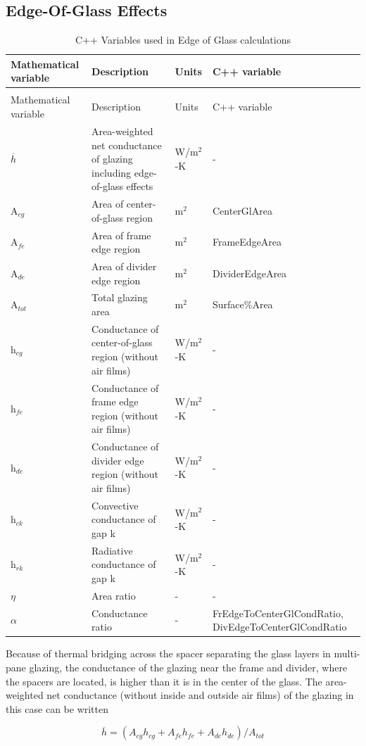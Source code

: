 \subsection{Edge-Of-Glass Effects}\label{edge-of-glass-effects}

\begin{longtable}[c]{p{1.0in}p{2.5in}p{1.0in}p{1.5in}}
\caption{C++ Variables used in Edge of Glass calculations \label{table:c++-variables-used-in-edge-of-glass}} \tabularnewline
\toprule 
Mathematical variable & Description & Units & C++ variable \tabularnewline
\midrule
\endfirsthead

\caption[]{C++ Variables used in Edge of Glass calculations} \tabularnewline
\toprule 
Mathematical variable & Description & Units & C++ variable \tabularnewline
\midrule
\endhead

\(\overline h\) & Area-weighted net conductance of glazing including edge-of-glass effects & W/m\(^{2}\)-K & - \tabularnewline
A\(_{cg}\) & Area of center-of-glass region & m\(^{2}\) & CenterGlArea \tabularnewline
A\(_{fe}\) & Area of frame edge region & m\(^{2}\) & FrameEdgeArea \tabularnewline
A\(_{de}\) & Area of divider edge region & m\(^{2}\) & DividerEdgeArea \tabularnewline
A\(_{tot}\) & Total glazing area & m\(^{2}\) & Surface\%Area \tabularnewline
h\(_{cg}\) & Conductance of center-of-glass region (without air films) & W/m\(^{2}\)-K & - \tabularnewline
h\(_{fe}\) & Conductance of frame edge region (without air films) & W/m\(^{2}\)-K & - \tabularnewline
h\(_{de}\) & Conductance of divider edge region (without air films) & W/m\(^{2}\)-K & - \tabularnewline
h\(_{ck}\) & Convective conductance of gap k & W/m\(^{2}\)-K & - \tabularnewline
h\(_{rk}\) & Radiative conductance of gap k & W/m\(^{2}\)-K & - \tabularnewline
$\eta$ & Area ratio & - & - \tabularnewline
$\alpha$ & Conductance ratio & - & FrEdgeToCenterGlCondRatio, DivEdgeToCenterGlCondRatio \tabularnewline
\bottomrule
\end{longtable}

Because of thermal bridging across the spacer separating the glass layers in multi-pane glazing, the conductance of the glazing near the frame and divider, where the spacers are located, is higher than it is in the center of the glass. The area-weighted net conductance (without inside and outside air films) of the glazing in this case can be written

\begin{equation}
\overline h  = \left( {{A_{cg}}{h_{cg}} + {A_{fe}}{h_{fe}} + {A_{de}}{h_{de}}} \right)/{A_{tot}}
\label{eq:AreaWeightedNetConductance}
\end{equation}

